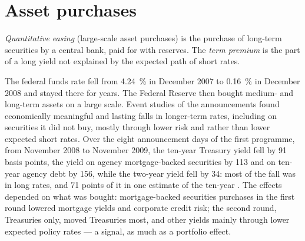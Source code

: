 \section{Asset purchases}\label{sec:b3:central-banking:qe}

\begin{definition}\label{def:b3:central-banking:qe}
\emph{Quantitative easing} (large-scale asset purchases) is the purchase of
long-term securities by a central bank, paid for with reserves. The \emph{term
premium} is the part of a long yield not explained by the expected path of short
rates.
\end{definition}

\begin{record}
The federal funds rate fell from 4.24~\% in December 2007 to 0.16~\% in December 2008
and stayed there for years. The Federal Reserve then bought medium- and long-term
assets on a large scale. Event studies of the announcements found economically
meaningful and lasting falls in longer-term rates, including on securities it did
not buy, mostly through lower risk and  rather than lower expected
short rates. %
Over the eight announcement days of the first programme, from November 2008 to
November 2009, the ten-year Treasury yield fell by 91 basis points, the yield on
agency mortgage-backed securities by 113 and on ten-year agency debt by 156, while
the two-year yield fell by 34: most of the fall was in long rates, and 71 points
of it in one estimate of the ten-year . %
The effects depended on what was bought: mortgage-backed securities purchases in
the first round lowered mortgage yields and corporate credit risk; the second
round, Treasuries only, moved Treasuries most, and other yields mainly through
lower expected policy rates --- a signal, as much as a portfolio effect.
\end{record}

